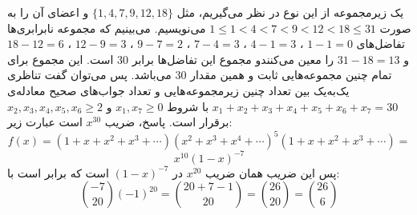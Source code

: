 \p
یک زیرمجموعه از این نوع در نظر می‌گیریم، مثل
$\{1, 4, 7, 9, 12, 18\}$
و اعضای آن را به صورت
$1 \leq 1 < 4 < 7 < 9 < 12 < 18 \leq 31$
می‌نویسیم. می‌بینیم که مجموعه نابرابری‌ها تفاضل‌های
$1 - 1 = 0$
،
$4 - 1 = 3$
،
$7 - 4 = 3$
،
$9 - 7 = 2$
،
$12 - 9 = 3$
،
$18 - 12 = 6$
و
$31 - 18 = 13$
را معین می‌کنندو مجموع این تفاضل‌ها برابر
$30$
است. این مجموع برای تمام چنین مجموعه‌هایی ثابت و همین مقدار
$30$
می‌باشد. پس می‌توان گفت تناظری یک‌به‌یک بین تعداد چنین زیرمجموعه‌هایی و تعداد جواب‌های صحیح معادله‌ی
$x_1 + x_2 + x_3 + x_4 + x_5 + x_6 + x_7 = 30$
با شروط
$x_1, x_7 \geq 0$
و
$x_2, x_3, x_4, x_5, x_6 \geq 2$
برقرار است. پاسخ، ضریب
$x^{30}$
است عبارت زیر:
$$f(x) = (1 + x + x^2 + x^3 + \cdots)(x^2 + x^3 + x^4 + \cdots)^5(1 + x + x^2 + x^3 + \cdots) =$$
$$x^{10}(1 - x)^{-7}$$
پس این ضریب همان ضریب
$x^{20}$
در
$(1 - x)^{-7}$
است که برابر است با:
$$\binom{-7}{20}(-1)^{20} = \binom{20 + 7 - 1}{20} = \binom{26}{20} = \binom{26}{6}$$